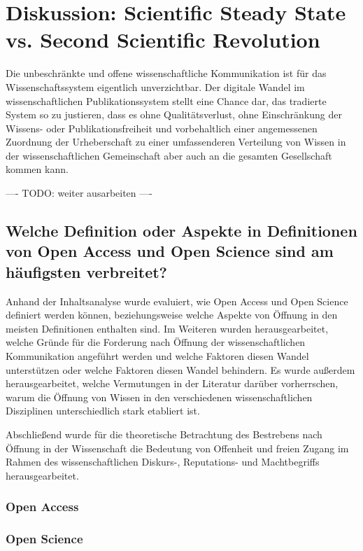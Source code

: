 \chapter{Diskussion: Scientific Steady State vs. Second Scientific Revolution}

Die unbeschränkte und offene wissenschaftliche Kommunikation ist für das Wissenschaftssystem eigentlich unverzichtbar. Der digitale Wandel im wissenschaftlichen Publikationssystem stellt eine Chance dar, das tradierte System so zu justieren, dass es ohne Qualitätsverlust, ohne Einschränkung der Wissens- oder Publikationsfreiheit und vorbehaltlich einer angemessenen Zuordnung der Urheberschaft zu einer umfassenderen Verteilung von Wissen in der wissenschaftlichen Gemeinschaft aber auch an die gesamten Gesellschaft kommen kann.



---- TODO: weiter ausarbeiten ----

\section{Welche Definition oder Aspekte in Definitionen von Open Access und Open Science sind am häufigsten verbreitet?}

Anhand der Inhaltsanalyse wurde evaluiert, wie Open Access und Open Science definiert werden können, beziehungsweise welche Aspekte von Öffnung in den meisten Definitionen enthalten sind. Im Weiteren wurden herausgearbeitet, welche Gründe für die Forderung nach Öffnung der wissenschaftlichen Kommunikation angeführt werden und welche Faktoren diesen Wandel unterstützen oder welche Faktoren diesen Wandel behindern. Es wurde außerdem herausgearbeitet, welche Vermutungen in der Literatur darüber vorherrschen, warum die Öffnung von Wissen in den verschiedenen wissenschaftlichen Disziplinen unterschiedlich stark etabliert ist.

Abschließend wurde für die theoretische Betrachtung des Bestrebens nach Öffnung in der Wissenschaft die Bedeutung von Offenheit und freien Zugang im Rahmen des wissenschaftlichen Diskurs-, Reputations- und Machtbegriffs herausgearbeitet.

\subsection{Open Access}

\subsection{Open Science}


